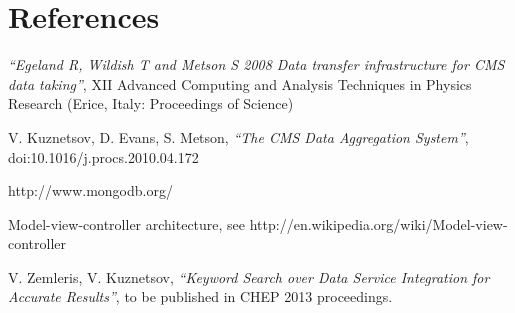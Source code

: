 \section*{References}

\begin{thebibliography}{1}
    {\it ``Egeland R, Wildish T and Metson S 2008 Data transfer infrastructure for CMS data taking''},  XII Advanced Computing and Analysis Techniques in Physics Research (Erice, Italy: Proceedings of Science)

 V. Kuznetsov, D. Evans, S. Metson, {\it ``The CMS Data Aggregation System''},
doi:10.1016/j.procs.2010.04.172

http://www.mongodb.org/

 Model-view-controller architecture, see
http://en.wikipedia.org/wiki/Model-view-controller

 V. Zemleris, V. Kuznetsov,
{\it ``Keyword Search over Data Service Integration for Accurate Results''},
to be published in CHEP 2013 proceedings.

\end{thebibliography}
